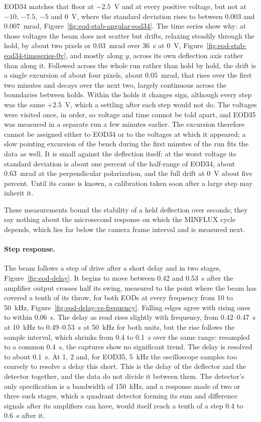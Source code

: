 \documentclass{article}
\begin{document}
EOD34 matches that floor at $-2.5$~V and at every positive voltage, but not at $-10$, $-7.5$,
$-5$ and 0~V, where the standard deviation rises to between 0.003 and 0.007~mrad,
Figure~\ref{fig:eod-stab-angular-eod34}. The time series show why: at those voltages the beam
does not scatter but drifts, relaxing steadily through the hold, by about two pixels or
0.03~mrad over 36~s at 0~V, Figure~\ref{fig:eod-stab-eod34-timeseries-0v}, and mostly along
$y$, across its own deflection axis rather than along it. Followed across the whole run rather
than hold by hold, the drift is a single excursion of about four pixels, about 0.05~mrad, that
rises over the first two minutes and decays over the next two, largely continuous across the
boundaries between holds. Within the holds it changes sign, although every step was the same
$+2.5$~V, which a settling after each step would not do. The voltages were visited once, in
order, so voltage and time cannot be told apart, and EOD35 was measured in a separate run a few
minutes earlier. The excursion therefore cannot be assigned either to EOD34 or to the voltages at
which it appeared; a slow pointing excursion of the bench during the first minutes of the run
fits the data as well. It is small against the deflection itself: at the
worst voltage its standard deviation is about one percent of the half-range of EOD34, about
0.63~mrad at the perpendicular polarization, and the full drift at 0~V about five percent. Until
its cause is known, a calibration taken soon after a large step may inherit it.

These measurements bound the stability of a held deflection over seconds; they say nothing about
the microsecond response on which the MINFLUX cycle depends, which lies far below the camera frame
interval and is measured next.

\paragraph{Step response.}
The beam follows a step of drive after a short delay and in two stages,
Figure~\ref{fig:eod-delay}. It begins to move between 0.42 and 0.53~\textmu s after the amplifier
output crosses half its swing, measured to the point where the beam has covered a tenth of its
throw, for both EODs at every frequency from 10 to 50~kHz,
Figure~\ref{fig:eod-delay-vs-frequency}. Falling edges agree with rising ones to within
0.06~\textmu s. The delay as read rises slightly with frequency, from 0.42--0.47~\textmu s at
10~kHz to 0.49--0.53~\textmu s at 50~kHz for both units, but the rise follows the sample interval,
which shrinks from 0.4 to 0.1~\textmu s over the same range: resampled to a common 0.4~\textmu s,
the captures show no significant trend. The delay is resolved to about 0.1~\textmu s. At 1,
2 and, for EOD35, 5~kHz the oscilloscope samples too coarsely to resolve a delay this short. This
is the delay of the deflector and the detector together, and the data do not divide it between
them. The detector's only specification is a bandwidth of 150~kHz, and a response made of two or
three such stages, which a quadrant detector forming its sum and difference signals after its
amplifiers can have, would itself reach a tenth of a step 0.4 to 0.6~\textmu s after it.
\end{document}
